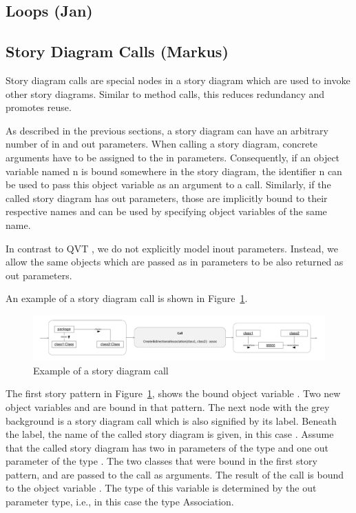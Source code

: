 \subsection{Loops (Jan)}

\subsection{Story Diagram Calls (Markus)}

Story diagram calls are special nodes in a story diagram which are used to invoke other story diagrams. Similar to method calls, this reduces redundancy and promotes reuse.

As described in the previous sections, a story diagram can have an arbitrary number of in and out parameters. When calling a story diagram, concrete arguments have to be assigned to the in parameters. Consequently, if an object variable named n is bound somewhere in the story diagram, the identifier n can be used to pass this object variable as an argument to a call. Similarly, if the called story diagram has out parameters, those are implicitly bound to their respective names and can be used by specifying object variables of the same name.

In contrast to QVT \cite{QVT}, we do not explicitly model inout parameters. Instead, we allow the same objects which are passed as in parameters to be also returned as out parameters.

An example of a story diagram call is shown in Figure~\ref{fig:call}.

\begin{figure}[htb]
\begin{center}
  \includegraphics[width=\textwidth]{figures/StoryDiagramCall}
  \caption{Example of a story diagram call}
  \label{fig:call}
\end{center}
\end{figure}

The first story pattern in Figure~\ref{fig:call}, shows the bound object variable . Two new object variables  and  are bound in that pattern. The next node with the grey background is a story diagram call which is also signified by its label. Beneath the label, the name of the called story diagram is given, in this case . Assume that the called story diagram has two in parameters of the type  and one out parameter of the type . The two classes that were bound in the first story pattern,  and  are passed to the call as arguments.
The result of the call is bound to the object variable . The type of this variable is determined by the out parameter type, i.e., in this case the type Association.

